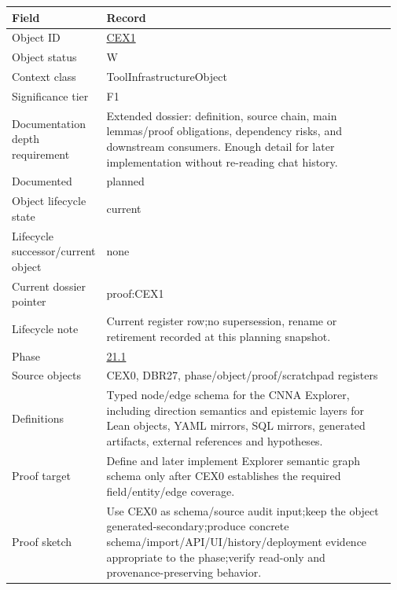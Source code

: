\begin{longtable}{L{0.16\linewidth} L{0.81\linewidth}}
\hline
\textbf{Field} & \textbf{Record}\\
\hline
Object ID & \hyperlink{object-row-CEX1}{CEX1}\\
\hline\addlinespace[0.20em]
Object status & W\\
\hline\addlinespace[0.20em]
Context class & ToolInfrastructureObject\\
\hline\addlinespace[0.20em]
Significance tier & F1\\
\hline\addlinespace[0.20em]
Documentation depth requirement & Extended dossier: definition, source chain, main lemmas/\allowbreak{}proof obligations, dependency risks, and downstream consumers. Enough detail for later implementation without re-reading chat history.\\
\hline\addlinespace[0.20em]
Documented & planned\\
\hline\addlinespace[0.20em]
Object lifecycle state & current\\
\hline\addlinespace[0.20em]
Lifecycle successor/\allowbreak{}current object & none\\
\hline\addlinespace[0.20em]
Current dossier pointer & proof:CEX1\\
\hline\addlinespace[0.20em]
Lifecycle note & Current register row;\newline no supersession, rename or retirement recorded at this planning snapshot.\\
\hline\addlinespace[0.20em]
Phase & \hyperlink{phase-row-21-1}{21.1}\\
\hline\addlinespace[0.20em]
Source objects & CEX0, DBR27, phase/\allowbreak{}object/\allowbreak{}proof/\allowbreak{}scratchpad registers\\
\hline\addlinespace[0.20em]
Definitions & Typed node/\allowbreak{}edge schema for the CNNA Explorer, including direction semantics and epistemic layers for Lean objects, YAML mirrors, SQL mirrors, generated artifacts, external references and hypotheses.\\
\hline\addlinespace[0.20em]
Proof target & Define and later implement Explorer semantic graph schema only after CEX0 establishes the required field/\allowbreak{}entity/\allowbreak{}edge coverage.\\
\hline\addlinespace[0.20em]
Proof sketch & Use CEX0 as schema/\allowbreak{}source audit input;\newline keep the object generated-secondary;\newline produce concrete schema/\allowbreak{}import/\allowbreak{}API/\allowbreak{}UI/\allowbreak{}history/\allowbreak{}deployment evidence appropriate to the phase;\newline verify read-only and provenance-preserving behavior.\\

\end{longtable}
